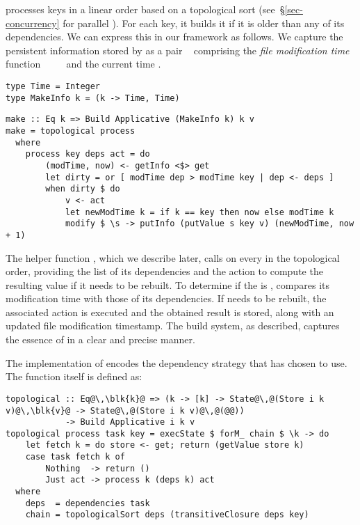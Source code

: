 \Make processes keys in a linear order based on a topological sort
(see~\S\ref{sec-concurrency} for parallel \Make). For each key, it builds it if
it is older than any of its dependencies. We can express this in our framework
as follows. We capture the persistent information stored by \Make as a pair
~ comprising the \emph{file modification time} function
~\hs{::}~~\hs{->}~ and the current time .

\begin{verbatim}
type Time = Integer
type MakeInfo k = (k -> Time, Time)
\end{verbatim}
\vspace{1mm}
\begin{verbatim}
make :: Eq k => Build Applicative (MakeInfo k) k v
make = topological process
  where
    process key deps act = do
        (modTime, now) <- getInfo <$> get
        let dirty = or [ modTime dep > modTime key | dep <- deps ]
        when dirty $ do
            v <- act
            let newModTime k = if k == key then now else modTime k
            modify $ \s -> putInfo (putValue s key v) (newModTime, now + 1)
\end{verbatim}

The helper function , which we describe later, calls
 on every  in the topological order, providing the list of
its dependencies  and the action  to compute the resulting
value if it needs to be rebuilt. To determine if the  is ,
 compares its modification time with those of its dependencies. If
 needs to be rebuilt, the associated action  is executed and
the obtained result is stored, along with an updated file modification
timestamp. The  build system, as described, captures the essence of
\Make in a clear and precise manner.

The implementation of  encodes the dependency strategy that
\Make has chosen to use. The function itself is defined as:

\vspace{1mm}
\begin{verbatim}
topological :: Eq@\,\blk{k}@ => (k -> [k] -> State@\,@(Store i k v)@\,\blk{v}@ -> State@\,@(Store i k v)@\,@(@@))
            -> Build Applicative i k v
topological process task key = execState $ forM_ chain $ \k -> do
    let fetch k = do store <- get; return (getValue store k)
    case task fetch k of
        Nothing  -> return ()
        Just act -> process k (deps k) act
  where
    deps  = dependencies task
    chain = topologicalSort deps (transitiveClosure deps key)
\end{verbatim}
\vspace{1mm}


